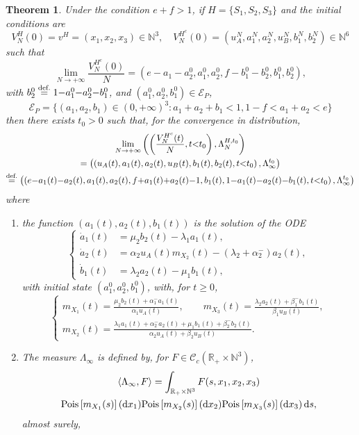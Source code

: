 \documentclass[english]{amsart}
\newcommand{\N}{\ensuremath{\mathbb{N}}}
\newcommand{\R}{\ensuremath{\mathbb{R}}}
\newcommand{\diff}{\mathop{}\mathopen{}\mathrm{d}}
\newcommand{\cal}[1]{\ensuremath{\mathcal{#1}}}
\newcommand\croc[1]{\left\langle #1\right\rangle}
\newcommand\steq[1]{\stackrel{\text{\rm #1.}}{=}}
\newcommand\Pois[1]{{\rm Pois}\left[#1\right]}
\newtheorem{theorem}[proposition]{Theorem}
\numberwithin{proposition}{section}
\begin{document}
\begin{theorem}\label{M2Th}
Under the condition $e{+}f{>}1$, if $H{=}\{{ S}_1,{ S}_2,{ S}_3\}$ and the initial conditions are 
\[
V_N^H(0)=v^H=(x_1,x_2,x_3)\in\N^3, \quad V_N^{H^c}(0)=(u_A^N,a_1^N,a_2^N,u_B^N,b_1^N,b_2^N)\in\N^6
\]
such that
\[
\lim_{N\to+\infty}\frac{V_N^{H^c}(0)}{N}= (e{-}{a}_1{-}a_2^0,a_1^0,a_2^0,f{-}b_1^0{-}b_2^0,b_1^0,b_2^0),
\]
with $b_2^0\steq{def}1{-}a_1^0{-}a_2^0{-}b_1^0$, and $(a_1^0,a_2^0,b_1^0){\in}{\cal E}_P$, 
\[
{\cal E}_P=\{ (a_1,a_2,b_1){\in}(0,{+}\infty)^3: a_1{+}a_2{+}b_1<1, 1{-}f{<}{a}_1{+}a_2< e\} 
\]
 then there exists $t_0{>}0$ such that, for the convergence in distribution, 
\begin{multline}\label{VM2}
\lim_{N\to+\infty}\left(\left(\frac{V_N^{H^c}(t)}{N},t{<}t_0\right),\Lambda_N^{H,t_0}\right)\\=\left(\left({u}_A(t),{a}_1(t),{a}_2(t),{u}_B(t),{b}_1(t),{b}_2(t), t{<}t_0\right),\Lambda_\infty^{t_0}\right)\\
{\steq{def}\left(\left(e{-}{a}_1(t){-}{a}_2(t),{a}_1(t),{a}_2(t),f{+}{a}_1(t){+}{a}_2(t){-}1,{b}_1(t),1{-}{a}_1(t){-}{a}_2(t){-}{b}_1(t), t{<}t_0\right),\Lambda_\infty^{t_0}\right)}
\end{multline}
where
\begin{enumerate}
\item the function $(a_1(t),a_2(t),b_1(t))$ is the solution of the ODE
\begin{equation}\label{ODEM2}
\begin{cases}
\dot{a}_1(t)&= \mu_2b_2(t)-\lambda_1 a_1(t),\\
\dot{a}_2(t)&=\alpha_2u_A(t)m_{X_2}(t) {-}(\lambda_2{+}\alpha_2^-)a_2(t),\\
\dot{b}_1(t)&=\lambda_2a_2(t)-\mu_1b_1(t),
\end{cases}
\end{equation}
with initial state $(a_1^0,a_2^0,b_1^0)$, with, for $t{\ge}0$,
\[
\begin{cases}
\displaystyle m_{X_1}(t)=\frac{\mu_2b_2(t){+}\alpha_1^-a_1(t)}{\alpha_1u_A(t)}, \qquad
m_{X_3}(t)=\frac{\lambda_2a_2(t){+}\beta_1^-b_1(t)}{\beta_1u_B(t)},\\
\displaystyle m_{X_2}(t)=\frac{\lambda_1a_1(t){+}\alpha_2^-a_2(t){+}\mu_1b_1(t){+}\beta_2^- b_2(t)}{\alpha_2 u_A(t){+}\beta_2u_B(t)}.
\end{cases}
\]
\item The measure $\Lambda_\infty$ is defined by, for $F{\in}{\cal C}_c(\R_+{\times}\N^3)$, 
\begin{multline*}
  \croc{\Lambda_\infty,F}=\int_{\R_+{\times}\N^3} F(s,x_1,x_2,x_3) \\ \Pois{m_{X_1}(s)}(\diff x_1)\Pois{m_{X_2}(s)}(\diff x_2)\Pois{m_{X_3}(s)}(\diff x_3)\diff s,
\end{multline*}
 almost surely,
\end{enumerate}
\end{theorem}
\end{document}
